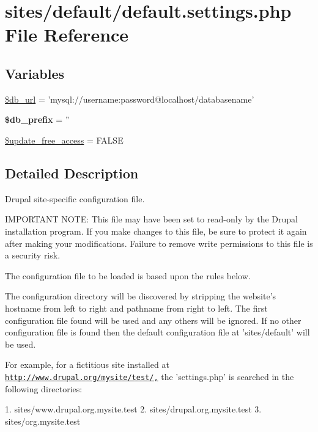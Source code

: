 \hypertarget{default_8settings_8php}{
\section{sites/default/default.settings.php File Reference}
\label{default_8settings_8php}
}
\subsection*{Variables}
\begin{CompactItemize}
\item 
\hyperlink{default_8settings_8php_01f60cfc6d59f1f30585ac6b516d739b}{\$db\_\-url} = 'mysql://username:password@localhost/databasename'
\item 
\hypertarget{default_8settings_8php_f2a4215b966f1c790a75937650bde991}{
\textbf{\$db\_\-prefix} = ''}
\label{default_8settings_8php_f2a4215b966f1c790a75937650bde991}

\item 
\hyperlink{default_8settings_8php_fa06f20a6b90dec9a2573e779cd10b44}{\$update\_\-free\_\-access} = FALSE
\end{CompactItemize}


\subsection{Detailed Description}
Drupal site-specific configuration file.

IMPORTANT NOTE: This file may have been set to read-only by the Drupal installation program. If you make changes to this file, be sure to protect it again after making your modifications. Failure to remove write permissions to this file is a security risk.

The configuration file to be loaded is based upon the rules below.

The configuration directory will be discovered by stripping the website's hostname from left to right and pathname from right to left. The first configuration file found will be used and any others will be ignored. If no other configuration file is found then the default configuration file at 'sites/default' will be used.

For example, for a fictitious site installed at \href{http://www.drupal.org/mysite/test/,}{\tt http://www.drupal.org/mysite/test/,} the 'settings.php' is searched in the following directories:

1. sites/www.drupal.org.mysite.test 2. sites/drupal.org.mysite.test 3. sites/org.mysite.test

